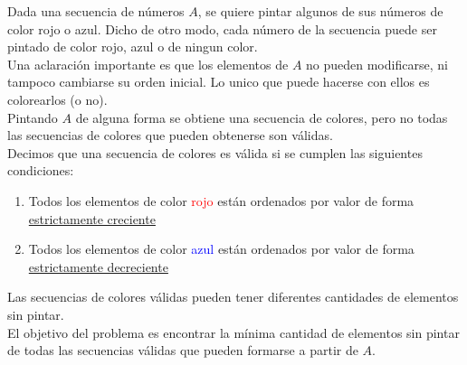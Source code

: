Dada una secuencia de números $A$, se quiere pintar algunos de sus números de color rojo o azul. Dicho de otro modo, cada número de la secuencia puede ser pintado de color rojo, azul o de ningun color. \\

Una aclaración importante es que los elementos de $A$ no pueden modificarse, ni tampoco cambiarse su orden inicial. Lo unico que puede hacerse con ellos es colorearlos (o no).\\

Pintando $A$ de alguna forma se obtiene una secuencia de colores, pero no todas las secuencias de colores que pueden obtenerse son válidas.\\

Decimos que una secuencia de colores es válida si se cumplen las siguientes condiciones:
\begin{enumerate}
\item Todos los elementos de color \textcolor{red}{rojo} están ordenados por valor de forma \underline{estrictamente creciente}
\item Todos los elementos de color \textcolor{blue}{azul} están ordenados por valor de forma \underline{estrictamente decreciente}
\end{enumerate}

Las secuencias de colores válidas pueden tener diferentes cantidades de elementos sin pintar. \\
El objetivo del problema es encontrar la mínima cantidad de elementos sin pintar de todas las secuencias válidas que pueden formarse a partir de $A$. \\

